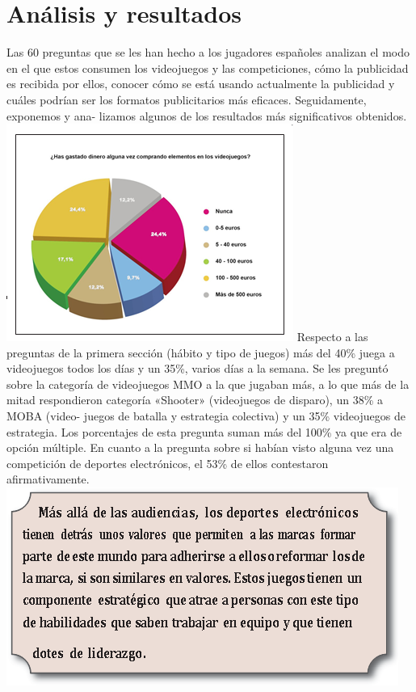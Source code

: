 \documentclass[a4paper,11pt]{article}
\begin{document}
\section{Análisis y resultados}
Las 60 preguntas que se les han hecho a los jugadores españoles analizan el modo en el que estos consumen los videojuegos y las competiciones, cómo la publicidad es recibida por ellos, conocer cómo se está usando actualmente la publicidad y cuáles podrían ser los formatos publicitarios más eficaces. Seguidamente, exponemos y ana- lizamos algunos de los resultados más significativos obtenidos.\\
\includegraphics[scale=1]{FIGURA2.png} 
Respecto a las preguntas de la primera sección (hábito y tipo de juegos) más del 40\% juega a videojuegos todos los días y un 35\%, varios días a la semana. Se les preguntó sobre la categoría de videojuegos MMO a la que jugaban más, a lo que más de la mitad respondieron categoría «Shooter» (videojuegos de disparo), un 38\% a MOBA (video- juegos de batalla y estrategia colectiva) y un 35\% videojuegos de estrategia. Los porcentajes de esta pregunta suman más del 100\% ya que era de opción múltiple. En cuanto a la pregunta sobre si habían visto alguna vez una competición de deportes electrónicos, el 53\% de ellos contestaron afirmativamente.
\includegraphics[scale=1]{FIGURA1.png} 
\end{document}
